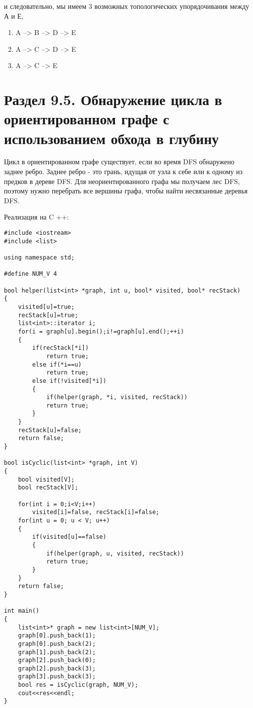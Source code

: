 и следовательно, мы имеем 3 возможных топологических упорядочивания между А и Е,

\begin{enumerate}
    \item A --> B --> D --> E
    \item A --> C --> D --> E
    \item A --> C --> E
\end{enumerate}

\section*{Раздел 9.5. Обнаружение цикла в ориентированном графе с
использованием обхода в глубину}

Цикл в ориентированном графе существует, если во время DFS обнаружено заднее ребро. Заднее ребро - это грань, идущая от узла к себе или к одному из предков в дереве DFS. Для неориентированного графа мы получаем лес DFS, поэтому нужно перебрать все вершины графа, чтобы найти несвязанные деревья DFS.

\vspace{\baselineskip}

Реализация на C ++:

\begin{tcolorbox}
\begin{verbatim}
#include <iostream>
#include <list>

using namespace std;

#define NUM_V 4

bool helper(list<int> *graph, int u, bool* visited, bool* recStack)
{
    visited[u]=true;
    recStack[u]=true;
    list<int>::iterator i;
    for(i = graph[u].begin();i!=graph[u].end();++i)
    {
        if(recStack[*i])
            return true;
        else if(*i==u)
            return true;
        else if(!visited[*i])
        { 
            if(helper(graph, *i, visited, recStack))
            return true;
        }
    }
    recStack[u]=false;
    return false;
}

bool isCyclic(list<int> *graph, int V)
{
    bool visited[V];
    bool recStack[V];
    
    for(int i = 0;i<V;i++)
        visited[i]=false, recStack[i]=false;
    for(int u = 0; u < V; u++) 
    { 
        if(visited[u]==false)
        { 
            if(helper(graph, u, visited, recStack))
            return true;
        }
    }
    return false;
}

int main()
{
    list<int>* graph = new list<int>[NUM_V];
    graph[0].push_back(1);
    graph[0].push_back(2);
    graph[1].push_back(2);
    graph[2].push_back(0);
    graph[2].push_back(3);
    graph[3].push_back(3);
    bool res = isCyclic(graph, NUM_V);
    cout<<res<<endl;
}
\end{verbatim}
\end{tcolorbox}

